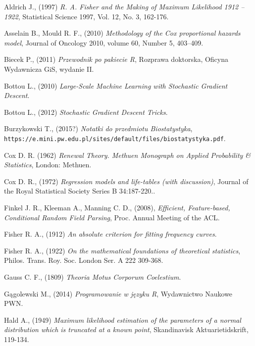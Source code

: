 \begin{thebibliography}{99}

 Aldrich J., (1997) \textit{R. A. Fisher and the Making of Maximum Likelihood 1912 – 1922}, Statistical Science
1997, Vol. 12, No. 3, 162-176.

 Asselain B., Mould R. F., (2010) \textit{Methodology of the Cox proportional hazards model},  Journal of Oncology 2010, volume 60, Number 5,  403–409.

 Biecek P., (2011) \textit{Przewodnik po pakiecie R}, Rozprawa doktorska, Oficyna Wydawnicza GiS, wydanie II.

 Bottou L., (2010) \textit{Large-Scale Machine Learning with Stochastic Gradient Descent}.

 Bottou L., (2012) \textit{Stochastic Gradient Descent Tricks}.

 Burzykowski T., (2015?) \textit{Notatki do przedmiotu Biostatystyka}, \texttt{https://e.mini.pw.edu.pl/sites/default/files/biostatystyka.pdf}.

 Cox D. R. (1962) \textit{Renewal Theory. Methuen Monograph on Applied Probability
\& Statistics}, London: Methuen.

  Cox D. R., (1972) \textit{Regression models and life-tables (with discussion)}, Journal of the Royal Statistical Society Series B 34:187-220.. 

  Finkel J. R., Kleeman A., Manning C. D., (2008), \textit{Efficient, Feature-based, Conditional Random Field Parsing}, Proc. Annual Meeting of the ACL.

 Fisher R. A., (1912) \textit{An absolute criterion for fitting frequency curves}. 

 Fisher R. A., (1922) \textit{On the mathematical foundations of theoretical statistics}, Philos. Trans. Roy. Soc. London Ser. A 222 309-368.


 Gauss C. F., (1809) \textit{Theoria Motus Corporum Coelestium}.

 Gągolewski M., (2014) \textit{Programowanie w języku R}, Wydawnictwo Naukowe PWN.


 Hald A., (1949) \textit{Maximum likelihood estimation of the parameters of a normal distribution which is truncated at a known point}, Skandinavisk Aktuarietidskrift, 119-134.


\end{thebibliography}
